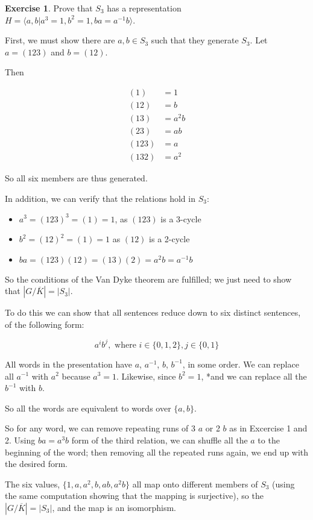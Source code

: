 \documentclass[11pt,oneside]{article}
\numberwithin{equation}{section}
\theoremstyle{definition}
\newtheorem{exercise}{Exercise}
\begin{document}
\begin{exercise}
Prove that $S_3$ has a representation $H = \langle a, b | a^3 =1, b^2 = 1, ba = a^{-1}b \rangle $.  
\end{exercise}
\begin{solution}

  First, we must show there are $a, b \in S_3$ such that they generate $S_3$.  Let $a = (1 2 3)$ and $b = (1 2)$.

  Then

  \begin{align*}
    (1) & = 1 \\
    (1 2 ) & = b \\
    (1 3) & = a^2 b \\
    (2 3) & = ab \\
    (1 2 3 ) & = a \\
    (1 3 2) & = a^2
  \end{align*}

  So all six members are thus generated.

  In addition, we can verify that the relations hold in $S_3$:

  \begin{itemize}
  \item
    $a^3 = (1 2 3)^3 = (1) = 1$, as $(1 2 3)$ is a 3-cycle
  \item
    $b^2 = (1 2)^2 = (1) = 1$ as $(1 2 )$ is a 2-cycle
  \item
    $ba = (1 2 3) (1 2) = (1 3) (2) = a^2 b = a^{-1} b$
  \end{itemize}

  So the conditions of the Van Dyke theorem are fulfilled; we just need to show that
  $|G / \overline K | = |S_3|$.

  To do this we can show that all sentences reduce down to six distinct sentences, of the following form:

  \[
  a^i b^j, \textrm{ where } i \in \{ 0, 1, 2 \}, j \in \{ 0, 1 \}
  \]


  All words in the presentation have $a$, $a^{-1}$, $b$, $b^{-1}$, in some order.
  We can replace all $a^{-1}$ with ${a^2}$ because $a^3 =1$.  Likewise, since $b^2 = 1$,
  *and we can replace all the $b^{-1}$ with $b$.

  So all the words are equivalent to words over $\{a, b\}$.

  
  So for any word, we can remove repeating runs of 3 $a$ or 2 $b$ as in Excercise 1 and 2.  Using $ba = a^3 b$ form of the
  third relation, we can shuffle all the $a$ to the beginning of the word; then removing all the repeated runs again,
  we end up with the desired form.

  The six values, $\{ 1, a, a^2, b, ab, a^2b \}$ all map onto different members of $S_3$ (using the same computation
  showing that the mapping is surjective), so the   $|G / \overline K | = |S_3|$, and the map is an isomorphism.  

\end{solution}

\begin{comment}
  \begin{exercise}
    problem
  \end{exercise}
  \begin{solution}
    \Begin{enumerate}[(a)]
    \item
      first answer
    \end{enumerate}
  \end{solution}
\end{comment}
\end{document}
